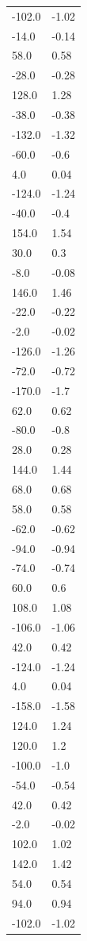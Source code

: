 \begin{longtable}{ll}
-102.0 & -1.02 \\
-14.0 & -0.14 \\
58.0 & 0.58 \\
-28.0 & -0.28 \\
128.0 & 1.28 \\
-38.0 & -0.38 \\
-132.0 & -1.32 \\
-60.0 & -0.6 \\
4.0 & 0.04 \\
-124.0 & -1.24 \\
-40.0 & -0.4 \\
154.0 & 1.54 \\
30.0 & 0.3 \\
-8.0 & -0.08 \\
146.0 & 1.46 \\
-22.0 & -0.22 \\
-2.0 & -0.02 \\
-126.0 & -1.26 \\
-72.0 & -0.72 \\
-170.0 & -1.7 \\
62.0 & 0.62 \\
-80.0 & -0.8 \\
28.0 & 0.28 \\
144.0 & 1.44 \\
68.0 & 0.68 \\
58.0 & 0.58 \\
-62.0 & -0.62 \\
-94.0 & -0.94 \\
-74.0 & -0.74 \\
60.0 & 0.6 \\
108.0 & 1.08 \\
-106.0 & -1.06 \\
42.0 & 0.42 \\
-124.0 & -1.24 \\
4.0 & 0.04 \\
-158.0 & -1.58 \\
124.0 & 1.24 \\
120.0 & 1.2 \\
-100.0 & -1.0 \\
-54.0 & -0.54 \\
42.0 & 0.42 \\
-2.0 & -0.02 \\
102.0 & 1.02 \\
142.0 & 1.42 \\
54.0 & 0.54 \\
94.0 & 0.94 \\
-102.0 & -1.02 \\

\end{longtable}
